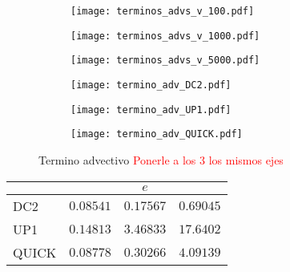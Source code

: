 \documentclass[aps,prb,twocolumn,superscriptaddress,floatfix,longbibliography,10pt]{revtex4-2}
\begin{document}
\begin{figure}
  \centering
  \begin{subfigure}[b]{0.32\textwidth}
    \centering
    \texttt{[image: terminos\_advs\_v\_100.pdf]}
    \caption{}
    \label{fig:terminos_advs_v_100}
  \end{subfigure}
  \hfill
  \begin{subfigure}[b]{0.32\textwidth}
    \centering
    \texttt{[image: terminos\_advs\_v\_1000.pdf]}
    \caption{}
    \label{fig:terminos_advs_v_1000}
  \end{subfigure}
  \hfill
  \begin{subfigure}[b]{0.32\textwidth}
    \centering
    \texttt{[image: terminos\_advs\_v\_5000.pdf]}
    \caption{}
    \label{fig:terminos_advs_v_5000}
  \end{subfigure}
     \caption{}
     \label{fig:terminos_advs_v}
\end{figure}




\begin{figure}
  \centering
  \begin{subfigure}[b]{0.32\textwidth}
      \centering
      \texttt{[image: termino\_adv\_DC2.pdf]}
      \caption{}
      \label{fig:termino_adv_DC2}
  \end{subfigure}
  \hfill
  \begin{subfigure}[b]{0.32\textwidth}
      \centering
      \texttt{[image: termino\_adv\_UP1.pdf]}
      \caption{}
      \label{fig:termino_adv_UP1}
  \end{subfigure}
  \hfill
  \begin{subfigure}[b]{0.32\textwidth}
      \centering
      \texttt{[image: termino\_adv\_QUICK.pdf]}
      \caption{}
      \label{fig:termino_adv_QUICK}
  \end{subfigure}
     \caption{Termino advectivo \textcolor{red}{Ponerle a los 3 los mismos ejes}}
     \label{fig:termino_advectivo}
\end{figure}



\twocolumngrid




\begin{table}[]
  \begin{tabular}{l|ccc|}
  \cline{2-4}
                            & \multicolumn{3}{c|}{$e$}                                                    \\ \hline
  \multicolumn{1}{|l|}{DC2} & \multicolumn{1}{c|}{$0.08541$} & \multicolumn{1}{c|}{$0.17567$} & $0.69045$ \\ \hline
  \multicolumn{1}{|l|}{UP1} & \multicolumn{1}{c|}{$0.14813$} & \multicolumn{1}{c|}{$3.46833$} & $17.6402$ \\ \hline
  \multicolumn{1}{|l|}{QUICK} & \multicolumn{1}{c|}{$0.08778$} & \multicolumn{1}{c|}{$0.30266$} & $4.09139$ \\ \hline
  \end{tabular}
  \end{table}
\end{document}
